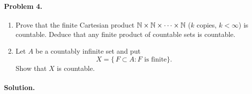 \documentclass[12pt]{article}
\theoremstyle{definition} %
\theoremstyle{plain} %
\begin{document}
\paragraph{Problem 4.}
\begin{enumerate}[label=\textbf{(\alph*)}]
\item Prove that the finite Cartesian product
      \(\Bbb N\times\Bbb N\times\cdots\times\Bbb N\)
      (\(k\) copies, \(k<\infty\)) is countable.
      Deduce that any finite product of countable sets is countable.

\item Let \(A\) be a countably infinite set and put
      \[
         X=\bigl\{\,F\subset A : F\text{ is finite}\bigr\}.
      \]
      Show that \(X\) is countable.
\end{enumerate}

\bigskip
\paragraph{Solution.}
\end{document}

